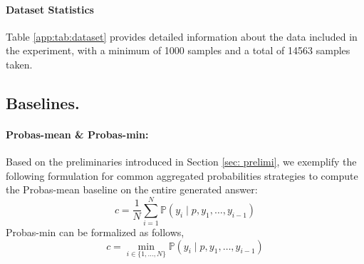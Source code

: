 \documentclass[11pt]{article}
\begin{document}
\paragraph{Dataset Statistics}
Table \ref{app:tab:dataset} provides detailed information about the data included in the experiment, with a minimum of 1000 samples and a total of 14563 samples taken.
\begin{table}[h]
    \centering
    \caption{Dataset statistics, where “Num.” represents the number of sampled datasets, and “Length” is the number of average tokens in the sampled dataset.}
    \vspace{-2mm}
    \label{app:tab:dataset}
\end{table}


\subsection{Baselines.}
\label{app:details:baseline}

\paragraph{Probas-mean \& Probas-min: } Based on the preliminaries introduced in Section \ref{sec: prelimi}, we exemplify the following formulation for common aggregated probabilities strategies to compute the Probas-mean baseline on the entire generated answer:
\begin{equation}
    c = \frac{1}{N} \sum_{i=1}^{N} \mathbb{P} \left( y_i \mid p, y_1, \dots, y_{i-1} \right)
\end{equation}
Probas-min can be formalized as follows,
\begin{equation}
    c = \min_{i \in \{1, \dots, N\}} \mathbb{P} \left( y_i \mid p, y_1, \dots, y_{i-1} \right)
\end{equation}
\end{document}
